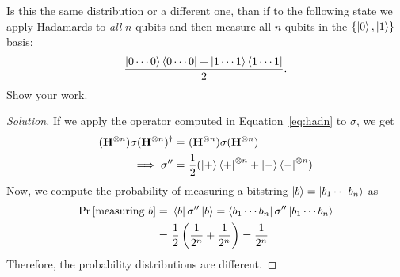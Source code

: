 \begin{solution}[label=ques:2d]
  \begin{question}
    Is this the same distribution or a different one, than if to the following state we apply Hadamards to \textit{all} $n$ qubits and then measure all $n$ qubits in the $\{\ket{0},\ket{1}\}$
basis:
\[
\frac{\ket{0\cdots 0}\bra{0\cdots0} + \ket{1\cdots1}\bra{1\cdots1}}{2} .
\]
Show your work.
  \end{question}
  \tcblower{}
  \begin{proof}[Solution]
    If we apply the operator computed in Equation~\ref{eq:hadn} to $\sigma$, we get
    \begin{equation}
      \begin{split}
      (\bfH^{\otimes n})\sigma(\bfH^{\otimes n})^\dagger = &\ (\bfH^{\otimes n})\sigma(\bfH^{\otimes n})\\
      \implies \sigma'' = &\ \frac{1}{2}(\ketbra{+}^{\otimes n} + \ketbra{-}^{\otimes n})
      \end{split}
      \label{eq:hadnsig}
    \end{equation}
    Now, we compute the probability of measuring a bitstring $\ket{b} = \ket{b_1\cdots b_n}$ as
    \begin{equation}
      \begin{split}
      \Pr\left[ \text{measuring }b \right] = &\ \bra{b}\sigma''\ket{b} = \bra{b_1\cdots b_n}\sigma''\ket{b_1\cdots b_n}\\
      = &\ \frac{1}{2}\left(\frac{1}{2^n} + \frac{1}{2^n}\right) = \frac{1}{2^n}
      \end{split}
      \label{eq:hadnmeassig}
    \end{equation}
    Therefore, the probability distributions are different.
  \end{proof}
\end{solution}
